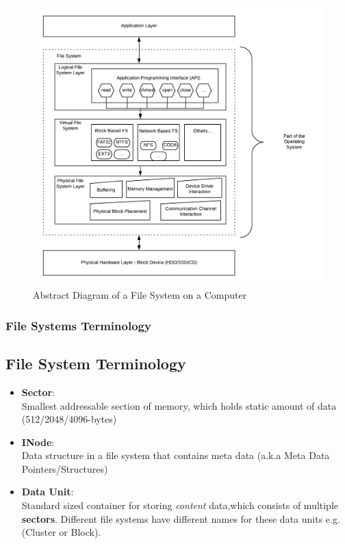 \documentclass{beamer}
\begin{document}
\begin{frame}
	\begin{figure}[h]
		\includegraphics[scale=0.4]{abstract-fs-diagram}
		\caption{Abstract Diagram of a File System on a Computer}
		\label{fig:abstract-fs-diagram}	
	\end{figure}
	
\end{frame}

\begin{frame}
	\frametitle{File Systems Terminology}
	\subsection*{File System Terminology}
	\begin{itemize}
		\item{\textbf{Sector}}:\\ Smallest addressable section of memory, which holds static amount of data (512/2048/4096-bytes)
		\item\textbf{INode}:\\ Data structure in a file system that contains meta data (a.k.a Meta Data Pointers/Structures)
		\item\textbf{Data Unit}:\\ Standard sized container for storing \textit{content} data,which consists of multiple \textbf{sectors}. Different file systems have different names for these data units e.g. (Cluster or Block). 
	\end{itemize}
\end{frame}
\end{document}
